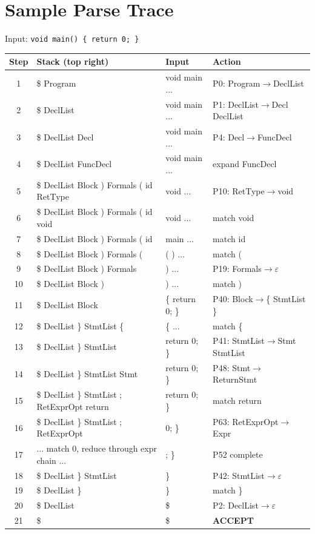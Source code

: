 \documentclass[12pt,a4paper]{article}
\begin{document}
\section{Sample Parse Trace}

Input: \texttt{void main() \{ return 0; \}}

\begin{center}
\begin{tabular}{clll}
\toprule
\textbf{Step} & \textbf{Stack (top right)} & \textbf{Input} & \textbf{Action} \\
\midrule
1  & \$ Program & void main ... & P0: Program$\to$DeclList \\
2  & \$ DeclList & void main ... & P1: DeclList$\to$Decl DeclList \\
3  & \$ DeclList Decl & void main ... & P4: Decl$\to$FuncDecl \\
4  & \$ DeclList FuncDecl & void main ... & expand FuncDecl \\
5  & \$ DeclList Block ) Formals ( id RetType & void ... & P10: RetType$\to$void \\
6  & \$ DeclList Block ) Formals ( id void & void ... & match void \\
7  & \$ DeclList Block ) Formals ( id & main ... & match id \\
8  & \$ DeclList Block ) Formals ( & ( ) ... & match ( \\
9  & \$ DeclList Block ) Formals & ) ... & P19: Formals$\to\varepsilon$ \\
10 & \$ DeclList Block ) & ) ... & match ) \\
11 & \$ DeclList Block & \{ return 0; \} & P40: Block$\to$\{ StmtList \} \\
12 & \$ DeclList \} StmtList \{ & \{ ... & match \{ \\
13 & \$ DeclList \} StmtList & return 0; \} & P41: StmtList$\to$Stmt StmtList \\
14 & \$ DeclList \} StmtList Stmt & return 0; \} & P48: Stmt$\to$ReturnStmt \\
15 & \$ DeclList \} StmtList ; RetExprOpt return & return 0; \} & match return \\
16 & \$ DeclList \} StmtList ; RetExprOpt & 0; \} & P63: RetExprOpt$\to$Expr \\
17 & ... match 0, reduce through expr chain ... & ; \} & P52 complete \\
18 & \$ DeclList \} StmtList & \} & P42: StmtList$\to\varepsilon$ \\
19 & \$ DeclList \} & \} & match \} \\
20 & \$ DeclList & \$ & P2: DeclList$\to\varepsilon$ \\
21 & \$ & \$ & \textbf{ACCEPT} \\
\bottomrule
\end{tabular}
\end{center}
\end{document}
